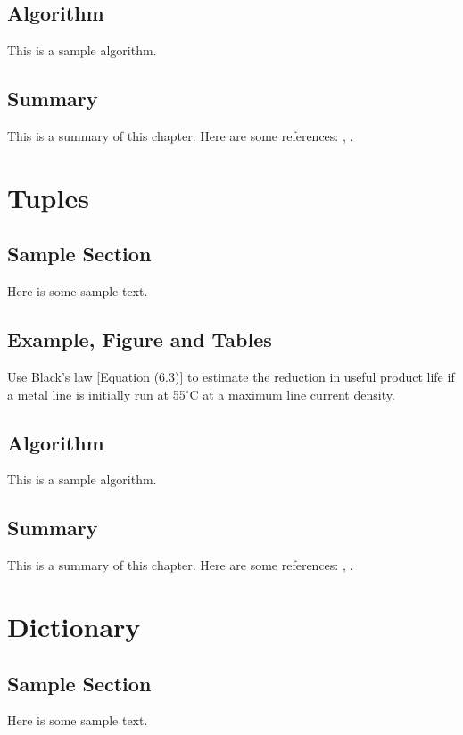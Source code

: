\documentclass{wileySix}
\begin{document}
\section{Algorithm}
This is a sample algorithm.

\section{Summary}
This is a summary of this chapter.
Here are some references: \cite{xkilby}, \cite{xberen}.

\chapter{Tuples}

\section{Sample Section}
Here is some sample text.

\section{Example, Figure and Tables}
\vskip6pt
\begin{example}
	Use Black's law [Equation (6.3)] to estimate the reduction in useful product
	life if a metal line is initially run at 55$^\circ$C at a maximum line
	current density.
\end{example}

\section{Algorithm}
This is a sample algorithm.

\section{Summary}
This is a summary of this chapter.
Here are some references: \cite{xkilby}, \cite{xberen}.

\chapter{Dictionary}

\section{Sample Section}
Here is some sample text.
\end{document}
